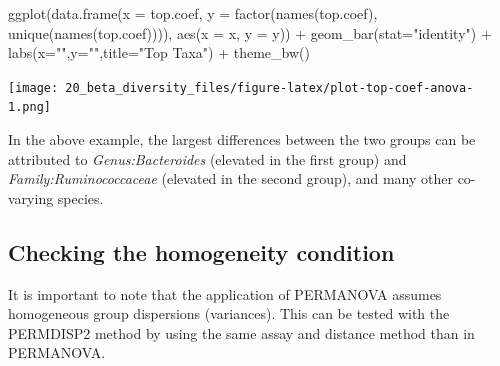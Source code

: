 \documentclass[
]{book}
\newenvironment{Shaded}{\begin{snugshade}}{\end{snugshade}}
\newcommand{\AttributeTok}[1]{\textcolor[rgb]{0.77,0.63,0.00}{#1}}
\newcommand{\FunctionTok}[1]{\textcolor[rgb]{0.00,0.00,0.00}{#1}}
\newcommand{\NormalTok}[1]{#1}
\newcommand{\SpecialCharTok}[1]{\textcolor[rgb]{0.00,0.00,0.00}{#1}}
\newcommand{\StringTok}[1]{\textcolor[rgb]{0.31,0.60,0.02}{#1}}
\begin{document}
\begin{Shaded}
\begin{Highlighting}[]
\FunctionTok{ggplot}\NormalTok{(}\FunctionTok{data.frame}\NormalTok{(}\AttributeTok{x =}\NormalTok{ top.coef,}
                  \AttributeTok{y =} \FunctionTok{factor}\NormalTok{(}\FunctionTok{names}\NormalTok{(top.coef),}
                                      \FunctionTok{unique}\NormalTok{(}\FunctionTok{names}\NormalTok{(top.coef)))),}
        \FunctionTok{aes}\NormalTok{(}\AttributeTok{x =}\NormalTok{ x, }\AttributeTok{y =}\NormalTok{ y)) }\SpecialCharTok{+}
    \FunctionTok{geom\_bar}\NormalTok{(}\AttributeTok{stat=}\StringTok{"identity"}\NormalTok{) }\SpecialCharTok{+}
    \FunctionTok{labs}\NormalTok{(}\AttributeTok{x=}\StringTok{""}\NormalTok{,}\AttributeTok{y=}\StringTok{""}\NormalTok{,}\AttributeTok{title=}\StringTok{"Top Taxa"}\NormalTok{) }\SpecialCharTok{+}
    \FunctionTok{theme\_bw}\NormalTok{()}
\end{Highlighting}
\end{Shaded}

\texttt{[image: 20\_beta\_diversity\_files/figure-latex/plot-top-coef-anova-1.png]}

In the above example, the largest differences between the two groups
can be attributed to \emph{Genus:Bacteroides} (elevated in the first
group) and \emph{Family:Ruminococcaceae} (elevated in the second
group), and many other co-varying species.

\hypertarget{checking-the-homogeneity-condition}{%
\subsection{Checking the homogeneity condition}\label{checking-the-homogeneity-condition}}

It is important to note that the application of PERMANOVA assumes
homogeneous group dispersions (variances). This can be tested with the
PERMDISP2 method \citep{Anderson2006} by using the same assay and distance
method than in PERMANOVA.

\begin{Shaded}
\end{Shaded}
\end{document}
